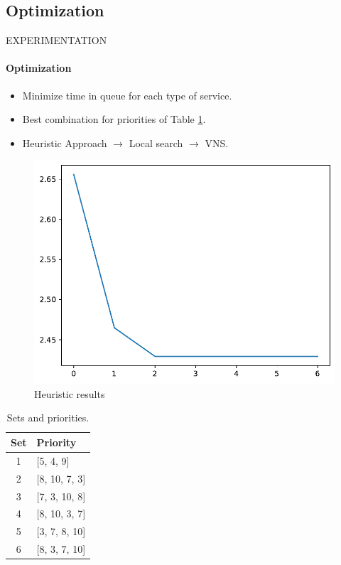 \subsection{Optimization}
\begin{frame}{EXPERIMENTATION}
    \framesubtitle{Optimization}
    \begin{itemize}
        \item Minimize time in queue for each type of service.
        \item Best combination for priorities of Table \ref{tab:sets_priorities_opt}.
        \item Heuristic Approach $\rightarrow$ Local search $\rightarrow$ VNS.
    \end{itemize}
    \begin{multicols}{2}
    \begin{figure}
        \centering
        \includegraphics[scale=.4]{images/opti.pdf}
        \caption{Heuristic results}
    \end{figure}
    \columnbreak
    \begin{table}[H]
\centering
\begin{tabular}{cl}
\hline
\textbf{Set} & \textbf{Priority} \\ \hline
1            & {[}5, 4, 9{]}     \\
2            & {[}8, 10, 7, 3{]} \\
3            & {[}7, 3, 10, 8{]} \\
4            & {[}8, 10, 3, 7{]} \\
5            & {[}3, 7, 8, 10{]} \\
6            & {[}8, 3, 7, 10{]} \\ \hline
\end{tabular}
\caption{Sets and priorities.}
\label{tab:sets_priorities_opt}
\end{table}
    \end{multicols}
\end{frame}

